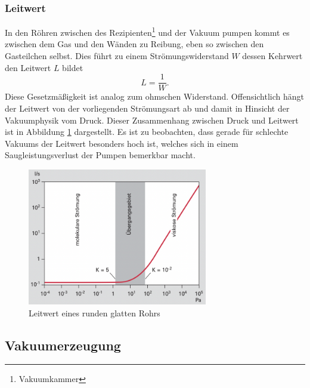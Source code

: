 \subsubsection*{Leitwert}
In den Röhren zwischen des Rezipienten\footnote{Vakuumkammer} und der Vakuum pumpen kommt es zwischen dem Gas 
und den Wänden zu Reibung, eben so zwischen den Gasteilchen selbst.
Dies führt zu einem Strömungswiderstand $W$ dessen Kehrwert den Leitwert $L$ bildet
\begin{equation}
    L = \frac{1}{W}.
\end{equation}
Diese Gesetzmäßigkeit ist analog zum ohmschen Widerstand.
Offensichtlich hängt der Leitwert von der vorliegenden Strömungsart ab
und damit in Hinsicht der Vakuumphysik vom Druck.
Dieser Zusammenhang zwischen Druck und Leitwert ist in Abbildung \ref{fig:leitwert} dargestellt.
Es ist zu beobachten, dass gerade für schlechte Vakuums der Leitwert besonders hoch ist,
welches sich in einem Saugleistungsverlust der Pumpen bemerkbar macht.
\begin{figure}[h]
    \centering
    \includegraphics[width=0.7\textwidth]{abb/leitwert.png}
    \caption{Leitwert eines runden glatten Rohrs \cite{Pfeifer}} 
    \label{fig:leitwert}
\end{figure} 



\subsection{Vakuumerzeugung}
